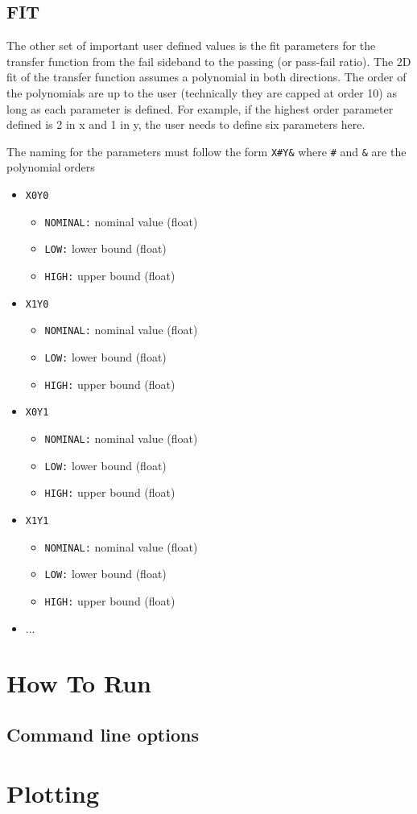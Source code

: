 \documentclass[letter]{article}
\begin{document}
	\subsection{FIT}
	The other set of important user defined values is the fit parameters for the transfer function from the fail sideband to the passing (or pass-fail ratio). The 2D fit of the transfer function assumes a polynomial in both directions. The order of the polynomials are up to the user (technically they are capped at order 10) as long as each parameter is defined. For example, if the highest order parameter defined is 2 in x and 1 in y, the user needs to define six parameters here.

	The naming for the parameters must follow the form \verb"X#Y&" where \verb"#" and \verb"&" are the polynomial orders
	\begin{itemize}
		\item \verb"X0Y0"
		\begin{itemize}
			\item \verb"NOMINAL:" nominal value (float)
			\item \verb"LOW:" lower bound (float)
			\item \verb"HIGH:" upper bound (float)
		\end{itemize}
		\item \verb"X1Y0"
		\begin{itemize}
			\item \verb"NOMINAL:" nominal value (float)
			\item \verb"LOW:" lower bound (float)
			\item \verb"HIGH:" upper bound (float)
		\end{itemize}
		\item \verb"X0Y1"
		\begin{itemize}
			\item \verb"NOMINAL:" nominal value (float)
			\item \verb"LOW:" lower bound (float)
			\item \verb"HIGH:" upper bound (float)
		\end{itemize}
		\item \verb"X1Y1"
		\begin{itemize}
			\item \verb"NOMINAL:" nominal value (float)
			\item \verb"LOW:" lower bound (float)
			\item \verb"HIGH:" upper bound (float)
		\end{itemize}
		\item ...
	\end{itemize}


\section{How To Run}
	\subsection{Command line options}

\section{Plotting}
\end{document}
